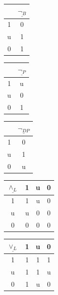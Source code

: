 \documentclass[10pt,a4paper]{article}
\theoremstyle{definition}
\newcommand{\3}{\vspace{.3in}}
\newcommand{\2}{\vspace{.2in}}
\newcommand{\1}{\vspace{.1in}}
\newcommand{\5}{\vspace{.05in}}
\begin{document}
	\begin{center}
	\begin{tabular}{|c|c|}
		\hline  & $\underline{\neg_B} $\\\hline
		1 & 0\\
		u & 1 \\
		0 & 1 \\\hline
	\end{tabular}
	\begin{tabular}{|c|c|}
		\hline  & $\underline{\neg_P} $\\\hline
		1 & u\\
		u & 0 \\
		0 & 1 \\\hline
	\end{tabular}
	\begin{tabular}{|c|c|}
		\hline  & $\underline{\neg_{\mathit{DP}}} $\\\hline
		1 & 0\\
		u & 1 \\
		0 & u \\\hline
	\end{tabular}
	\begin{tabular}{|c|ccc|}
		\hline
		$\underline{\wedge_L} $ & 1 & u & 0 \\
		\hline
		1 & 1 & u & 0 \\
		u & u & 0 & 0 \\
		0 & 0 & 0 & 0 \\
		\hline
	\end{tabular}
	\begin{tabular}{|c|ccc|}
		\hline
		$\underline{\vee_L} $ & 1 & u & 0 \\
		\hline
		1 & 1 & 1 & 1 \\
		u & 1 & 1 & u \\
		0 & 1 & u & 0 \\
		\hline
	\end{tabular}
\end{center}
\end{document}
